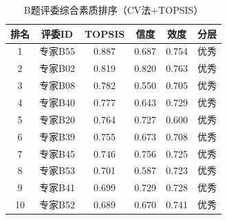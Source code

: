 \begin{table}[h]
\centering
\caption{B题评委综合素质排序（CV法+TOPSIS）}
\begin{tabular}{cccccc}
\hline
排名 & 评委ID & TOPSIS & 信度 & 效度 & 分层 \\
\hline
1 & 专家B55 & 0.887 & 0.687 & 0.754 & 优秀 \\
2 & 专家B02 & 0.819 & 0.820 & 0.763 & 优秀 \\
3 & 专家B08 & 0.782 & 0.550 & 0.705 & 优秀 \\
4 & 专家B40 & 0.777 & 0.643 & 0.729 & 优秀 \\
5 & 专家B20 & 0.764 & 0.727 & 0.600 & 优秀 \\
6 & 专家B39 & 0.755 & 0.673 & 0.708 & 优秀 \\
7 & 专家B45 & 0.746 & 0.756 & 0.725 & 优秀 \\
8 & 专家B53 & 0.701 & 0.587 & 0.723 & 优秀 \\
9 & 专家B41 & 0.699 & 0.729 & 0.728 & 优秀 \\
10 & 专家B52 & 0.689 & 0.670 & 0.741 & 优秀 \\
\hline
\end{tabular}
\end{table}